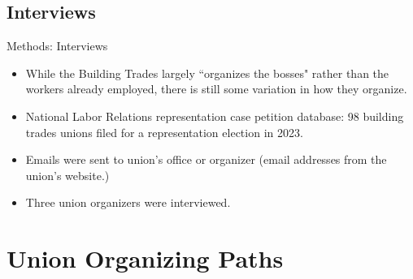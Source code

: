 \documentclass{beamer}
\begin{document}
\subsection{Interviews}
\begin{frame}{Methods: Interviews}
\begin{itemize}
	\item While the Building Trades largely ``organizes the bosses" rather than the workers already employed, there is still some variation in how they organize. 
	\item National Labor Relations representation case petition database: 98 building trades unions filed for a representation election in 2023. 
	\item Emails were sent to union's office or organizer (email addresses from the union's website.)
	\item Three union organizers were interviewed.
\end{itemize}

\end{frame}

\section{Union Organizing Paths}
\end{document}
